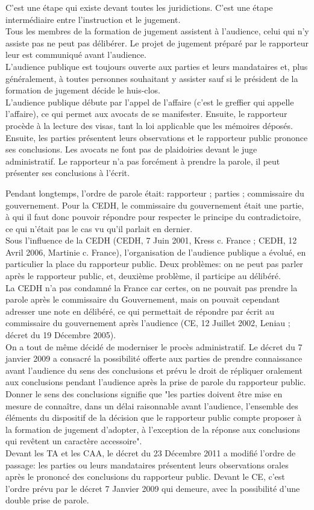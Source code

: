 \documentclass[10pt, a4paper, openany]{book}
\begin{document}
C'est une étape qui existe devant toutes les juridictions. C'est une étape intermédiaire entre l'instruction et le jugement. \\
Tous les membres de la formation de jugement assistent à l'audience, celui qui n'y assiste pas ne peut pas délibérer. Le projet de jugement préparé par le rapporteur leur est communiqué avant l'audience. \\
L'audience publique est toujours ouverte aux parties et leurs mandataires et, plus généralement, à toutes personnes souhaitant y assister sauf si le président de la formation de jugement décide le huis-clos. \\
L'audience publique débute par l'appel de l'affaire (c'est le greffier qui appelle l'affaire), ce qui permet aux avocats de se manifester. Ensuite, le rapporteur procède à la lecture des visas, tant la loi applicable que les mémoires déposés. Ensuite, les parties présentent leurs observations et le rapporteur public prononce ses conclusions. Les avocats ne font pas de plaidoiries devant le juge administratif. Le rapporteur n'a pas forcément à prendre la parole, il peut présenter ses conclusions à l'écrit.


Pendant longtemps, l'ordre de parole était: rapporteur ; parties ; commissaire du gouvernement. Pour la CEDH, le commissaire du gouvernement était une partie, à qui il faut donc pouvoir répondre pour respecter le principe du contradictoire, ce qui n'était pas le cas vu qu'il parlait en dernier. \\
Sous l'influence de la CEDH (CEDH, 7 Juin 2001, Kress c. France ; CEDH, 12 Avril 2006, Martinie c. France), l'organisation de l'audience publique a évolué, en particulier la place du rapporteur public. Deux problèmes: on ne peut pas parler après le rapporteur public, et, deuxième problème, il participe au délibéré. \\
La CEDH n'a pas condamné la France car certes, on ne pouvait pas prendre la parole après le commissaire du Gouvernement, mais on pouvait cependant adresser une note en délibéré, ce qui permettait de répondre par écrit au commissaire du gouvernement après l'audience (CE, 12 Juillet 2002, Leniau ; décret du 19 Décembre 2005). \\
On a tout de même décidé de moderniser le procès administratif. Le décret du 7 janvier 2009 a consacré la possibilité offerte aux parties de prendre connaissance avant l'audience du sens des conclusions et prévu le droit de répliquer oralement aux conclusions pendant l'audience après la prise de parole du rapporteur public. Donner le sens des conclusions signifie que "les parties doivent être mise en mesure de connaître, dans un délai raisonnable avant l'audience, l'ensemble des éléments du dispositif de la décision que le rapporteur public compte proposer à la formation de jugement d'adopter, à l'exception de la réponse aux conclusions qui revêtent un caractère accessoire". \\
Devant les TA et les CAA, le décret du 23 Décembre 2011 a modifié l'ordre de passage: les parties ou leurs mandataires présentent leurs observations orales après le prononcé des conclusions du rapporteur public. Devant le CE, c'est l'ordre prévu par le décret 7 Janvier 2009 qui demeure, avec la possibilité d'une double prise de parole. 
\end{document}
